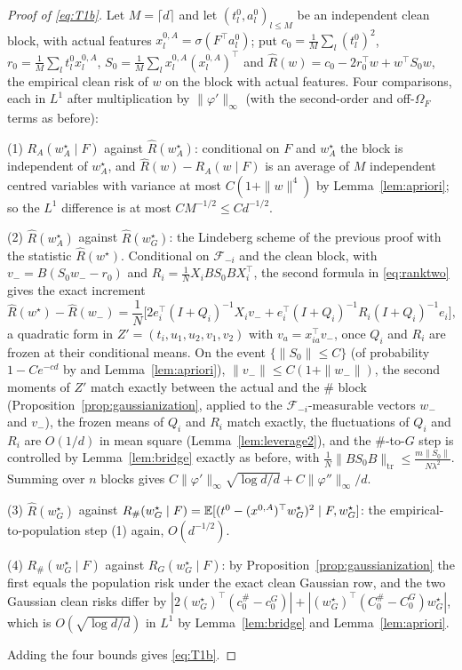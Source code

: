 \begin{proof}[Proof of \eqref{eq:T1b}]
Let $M=\lceil d\rceil$ and let $(t^0_l,a^0_l)_{l\le M}$ be an independent clean block, with actual features
$x^{0,A}_l=\sigma(F^\top a^0_l)$; put $c_0=\frac1M\sum_l(t^0_l)^2$, $r_0=\frac1M\sum_lt^0_lx^{0,A}_l$,
$S_0=\frac1M\sum_lx^{0,A}_l(x^{0,A}_l)^\top$ and $\widehat R(w)=c_0-2r_0^\top w+w^\top S_0w$, the empirical clean risk of
$w$ on the block with actual features. Four comparisons, each in $L^1$ after multiplication by
$\|\varphi'\|_\infty$ (with the second-order and off-$\Omega_F$ terms as before):

(1) $R_A(w_A^\star\mid F)$ against $\widehat R(w_A^\star)$: conditional on $F$ and $w_A^\star$ the block is
independent of $w_A^\star$, and $\widehat R(w)-R_A(w\mid F)$ is an average of $M$ independent centred variables
with variance at most $C(1+\|w\|^4)$ by Lemma~\ref{lem:apriori}; so the $L^1$ difference is at most
$C M^{-1/2}\le Cd^{-1/2}$.

(2) $\widehat R(w_A^\star)$ against $\widehat R(w_G^\star)$: the Lindeberg scheme of the previous proof with the
statistic $\widehat R(w^\star)$. Conditional on $\mathcal F_{-i}$ and the clean block, with $v_-=B(S_0w_--r_0)$ and
$R_i=\frac1NX_iBS_0BX_i^\top$, the second formula in \eqref{eq:ranktwo} gives the exact increment
\[
\widehat R(w^\star)-\widehat R(w_-)=\frac1N\Big[2e_i^\top(I+Q_i)^{-1}X_iv_-+e_i^\top(I+Q_i)^{-1}R_i(I+Q_i)^{-1}e_i\Big],
\]
a quadratic form in $Z'=(t_i,u_1,u_2,v_1,v_2)$ with $v_a=x_{ia}^\top v_-$, once $Q_i$ and $R_i$ are frozen at their
conditional means. On the event $\{\|S_0\|\le C\}$ (of probability $1-Ce^{-cd}$ by \cite[Theorem~4.6.1]{Vershynin}
and Lemma~\ref{lem:apriori}), $\|v_-\|\le C(1+\|w_-\|)$, the second moments of $Z'$ match exactly between the
actual and the $\#$ block (Proposition~\ref{prop:gaussianization}, applied to the $\mathcal F_{-i}$-measurable
vectors $w_-$ and $v_-$), the frozen means of $Q_i$ and $R_i$ match exactly, the fluctuations of $Q_i$ and $R_i$
are $O(1/d)$ in mean square (Lemma~\ref{lem:leverage2}), and the $\#$-to-$G$ step is controlled by
Lemma~\ref{lem:bridge} exactly as before, with $\frac1N\|BS_0B\|_{\mathrm{tr}}\le\frac{m\|S_0\|}{N\lambda^2}$. Summing
over $n$ blocks gives $C\|\varphi'\|_\infty\sqrt{\log d/d}+C\|\varphi''\|_\infty/d$.

(3) $\widehat R(w_G^\star)$ against $R_\#(w_G^\star\mid F)=\mathbb{E}[(t^0-(x^{0,A})^\top w_G^\star)^2\mid F,w_G^\star]$: the
empirical-to-population step (1) again, $O(d^{-1/2})$.

(4) $R_\#(w_G^\star\mid F)$ against $R_G(w_G^\star\mid F)$: by Proposition~\ref{prop:gaussianization} the first
equals the population risk under the exact clean Gaussian row, and the two Gaussian clean risks differ by
$|2(w_G^\star)^\top(c_0^\#-c_0^G)|+|(w_G^\star)^\top(C_0^\#-C_0^G)w_G^\star|$, which is $O(\sqrt{\log d/d})$ in $L^1$ by
Lemma~\ref{lem:bridge} and Lemma~\ref{lem:apriori}.

Adding the four bounds gives \eqref{eq:T1b}.
\end{proof}

